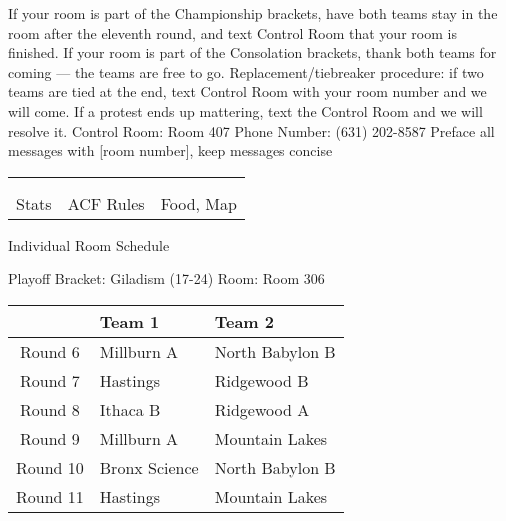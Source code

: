\documentclass{article}%
\begin{document}
\vspace*{16pt}%
\linebreak%
If your room is part of the Championship brackets, have both teams stay in the room after the eleventh round, and text Control Room that your room is finished.\newline%
\newline%
If your room is part of the Consolation brackets, thank both teams for coming — the teams are free to go.\newline%
\newline%
Replacement/tiebreaker procedure: if two teams are tied at the end, text Control Room with your room number and we will come. If a protest ends up mattering, text the Control Room and we will resolve it.\newline%
\newline%
Control Room: Room 407\newline%
Phone Number: (631) 202{-}8587\newline%
Preface all messages with {[}room number{]}, keep messages concise%
\vspace*{30pt}%
\newline%
%
\begin{tabularx}{\textwidth}{YYY}%
  &  &  \\%
\\%
Stats&ACF Rules&Food, Map\\%
\end{tabularx}%
\newpage%
\begin{center}%
\begin{Huge}%
Individual Room Schedule%
\end{Huge}%
\vspace*{16pt}%
\linebreak%
\begin{Large}%
Playoff Bracket: Giladism (17-24) \hfill Room: Room 306%
\end{Large}%
\end{center}%
%
\begin{tabularx}{\textwidth}{|c|Y|Y|}%
\hline%
&Team 1&Team 2\\%
\hline%
Round 6&Millburn A&North Babylon B\\%
Round 7&Hastings&Ridgewood B\\%
Round 8&Ithaca B&Ridgewood A\\%
Round 9&Millburn A&Mountain Lakes\\%
Round 10&Bronx Science&North Babylon B\\%
Round 11&Hastings&Mountain Lakes\\%
\hline%
\end{tabularx}%
\end{document}
